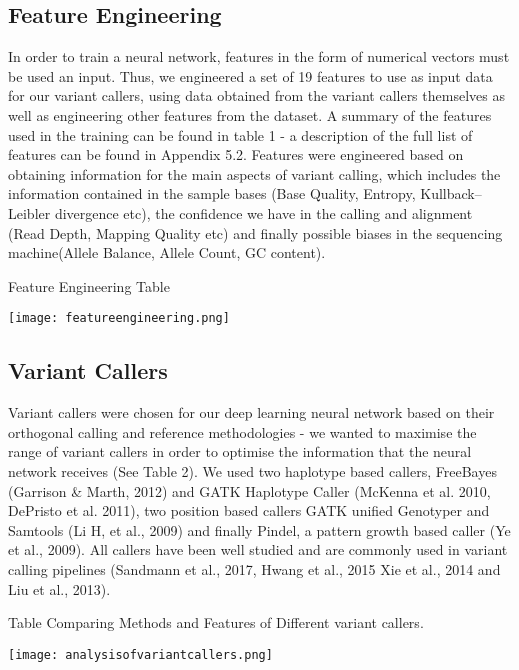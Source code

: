 \documentclass{article}
\begin{document}
\subsection{Feature Engineering}
In order to train a neural network, features in the form of numerical vectors must be used an input. Thus, we engineered a set of 19 features to use as input data for our variant callers, using data obtained from the variant callers themselves as well as engineering other features from the dataset. A summary of the features used in the training can be found in table 1 - a description of the full list of features can be found in Appendix 5.2. Features were engineered based on obtaining information for the main aspects of variant calling, which includes the information contained in the sample bases (Base Quality, Entropy, Kullback–Leibler divergence etc), the confidence we have in the calling and alignment (Read Depth, Mapping Quality etc) and finally possible biases in the sequencing machine(Allele Balance, Allele Count, GC content).

\begin{table}[H]
\caption{Feature Engineering Table}
\texttt{[image: featureengineering.png]}
\centering
\end{table}

\subsection{Variant Callers}
Variant callers were chosen for our deep learning neural network based on their orthogonal calling and reference methodologies - we wanted to maximise the range of variant callers in order to optimise the information that the neural network receives (See Table 2). We used two haplotype based callers, FreeBayes (Garrison \& Marth, 2012) and GATK Haplotype Caller (McKenna et al. 2010, DePristo et al. 2011), two position based callers GATK unified Genotyper and Samtools (Li H, et al., 2009) and finally Pindel, a pattern growth based caller (Ye et al., 2009). All callers have been well studied and are commonly used in variant calling pipelines (Sandmann et al., 2017, Hwang et al., 2015 Xie et al., 2014 and Liu et al., 2013). 

\begin{table}[H]
\caption{Table Comparing Methods and Features of Different variant callers.}
\texttt{[image: analysisofvariantcallers.png]}
\centering
\end{table}
\end{document}
